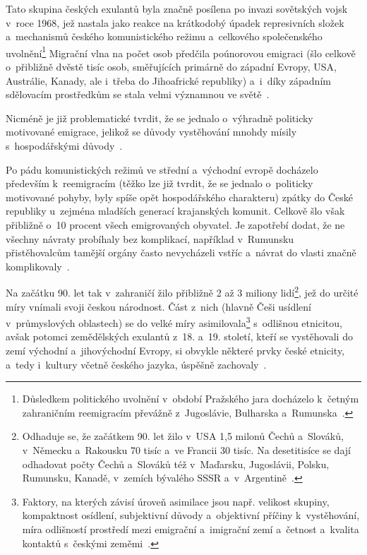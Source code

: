 Tato skupina českých exulantů byla značně posílena po invazi sovětských vojsk v~roce 1968, jež nastala jako reakce na krátkodobý úpadek represivních složek a~mechanismů českého komunistického režimu a~celkového společenského uvolnění\footnote{Důsledkem politického uvolnění v~období Pražského jara docházelo k~četným zahraničním reemigracím převážně z~Jugoslávie, Bulharska a~Rumunska~\parencite{Nespor2005}.} Migrační vlna na počet osob předčila poúnorovou emigraci (šlo celkově o~přibližně dvěstě tisíc osob, směřujících primárně do západní Evropy, USA, Austrálie, Kanady, ale i~třeba do Jihoafrické republiky) a~i~díky západním sdělovacím prostředkům se stala velmi významnou ve světě~\parencite{Vaculik2002}.

Nicméně je již problematické tvrdit, že se jednalo o~výhradně politicky motivované emigrace, jelikož se důvody vystěhování mnohdy mísily s~hospodářskými důvody~\parencite{Broucek2017}.

Po pádu komunistických režimů ve střední a~východní evropě docházelo především k~reemigracím (těžko lze již tvrdit, že se jednalo o~politicky motivované pohyby, byly spíše opět hospodářského charakteru) zpátky do České republiky u~zejména mladších generací krajanských komunit. Celkově šlo však přibližně o~10 procent všech emigrovaných obyvatel. Je zapotřebí dodat, že ne všechny návraty probíhaly bez komplikací, například v~Rumunsku přistěhovalcům tamější orgány často nevycházeli vstříc a~návrat do vlasti značně komplikovaly~\parencite{Nespor2005}.

Na začátku 90. let tak v~zahraničí žilo přibližně 2 až 3 miliony lidí\footnote{Odhaduje se, že začátkem 90. let žilo v~USA 1,5 milonů Čechů a~Slováků, v~Německu a~Rakousku 70 tisíc a~ve Francii 30 tisíc. Na desetitisíce se dají odhadovat počty Čechů a~Slováků též v~Maďarsku, Jugoslávii, Polsku, Rumunsku, Kanadě, v~zemích bývalého SSSR a~v~Argentině~\parencite{Broucek2017}.}, jež do určité míry vnímali svoji českou národnost. Část z~nich (hlavně Češi usídlení v~průmyslových oblastech) se do velké míry asimilovala\footnote{Faktory, na kterých závisí úroveň asimilace jsou např. velikost skupiny, kompaktnost osídlení, subjektivní důvody a~objektivní příčiny k~vystěhování, míra odlišností prostředí mezi emigrační a~imigrační zemí a~četnost a~kvalita kontaktů s~českými zeměmi~\parencite{Petrusek2017}.} s~odlišnou etnicitou, avšak potomci zemědělských exulantů z~18. a~19. století, kteří se vystěhovali do zemí východní a~jihovýchodní Evropy, si obvykle některé prvky české etnicity, a~tedy i~kultury včetně českého jazyka, úspěšně zachovaly~\parencite{Broucek2017}.

